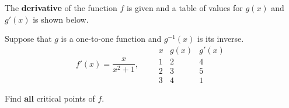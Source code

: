 \documentclass{ximera}
\author{Gregory Hartman \and Matthew Carr}
\begin{document}
\begin{exercise}



The \textbf{derivative} of the function $f$ is given and a table of values for $g(x)$ and $g'(x)$ is shown below.

Suppose that $g$ is a one-to-one function and $g^{-1}(x)$ is its inverse.
\[
f'(x)=\frac{x}{x^2+1},\qquad
\begin{array}{c|c|c}
x & g(x) & g'(x)\\ \hline
1 & 2 & 4\\ \hline
2 & 3 & 5\\ \hline
3 & 4 & 1
\end{array}
\]

Find \textbf{all} critical points of $f$.
\begin{prompt}
\begin{multipleChoice}
\end{multipleChoice}
\end{prompt}

\end{exercise}
\end{document}
